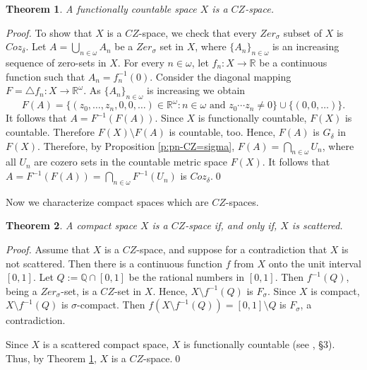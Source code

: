 \documentclass[preprint,11pt]{elsarticle}
\newtheorem{theorem}{Theorem}[section]
\numberwithin{equation}{section}
\numberwithin{theorem}{section}
\newcommand{\w}{\omega}
\newcommand{\IR}{\mathbb{R}}
\begin{document}
\begin{theorem}\label{t:cz-fc}
A functionally countable space $X$ is a $CZ$-space.
\end{theorem}

\begin{proof}
To show that $X$ is a $CZ$-space, we check that every $Zer_{\sigma}$ subset of $X$ is $Coz_{\delta}$. Let $A=\bigcup_{n\in\w} A_n$ be a  $Zer_{\sigma}$ set in $X$, where $\{A_n\}_{n\in\w}$ is an increasing sequence of zero-sets in $X$. For every $n\in\w$, let $f_n: X\to \IR$ be a continuous function such that $A_n=f^{-1}_n(0)$. Consider the diagonal mapping $F=\triangle f_n: X\to \IR^{\w}$. As $\{A_n\}_{n\in\w}$ is increasing we obtain
\[
F(A)=\big\{(z_0,\dots,z_n,0,0,\dots)\in\IR^\w: n\in\w \mbox{ and } z_0\cdots z_n\not=0\big\} \cup\{(0,0,\dots)\}.
\]
It follows that $A=F^{-1}(F(A))$. Since $X$ is functionally countable, $F(X)$ is countable. Therefore $F(X)\setminus F(A)$ is countable, too. Hence, $F(A)$ is $G_{\delta}$ in $F(X)$. Therefore, by Proposition \ref{p:pn-CZ=sigma}, $F(A)=\bigcap_{n\in\w} U_n$, where all $U_n$ are cozero sets in the countable metric space $F(X)$. It follows that $A=F^{-1}(F(A))=\bigcap_{n\in\w} F^{-1}(U_n)$ is $Coz_{\delta}$.\qed
\end{proof}


Now we characterize compact spaces which are $CZ$-spaces.
\begin{theorem}\label{t:cz-compact}
A compact space $X$ is a $CZ$-space if, and only if, $X$ is scattered.
\end{theorem}

\begin{proof}
Assume that $X$ is a $CZ$-space, and suppose for a contradiction that $X$ is not scattered. Then there is a continuous function $f$ from $X$ onto the unit interval $[0,1]$. Let $Q:=\mathbb{Q}\cap[0,1]$ be the rational numbers in $[0,1]$. Then $f^{-1}(Q)$, being a $Zer_\sigma$-set, is a $CZ$-set in $X$. Hence, $X\setminus f^{-1}(Q)$ is $F_{\sigma}$. Since $X$ is compact, $X\setminus f^{-1}(Q)$ is $\sigma$-compact. Then $f(X\setminus f^{-1}(Q))=[0,1]\setminus Q$ is $F_{\sigma}$,  a contradiction.
\smallskip

Since $X$ is a scattered compact space, $X$ is functionally countable (see \cite{Arh}, \S 3). Thus, by Theorem \ref{t:cz-fc}, $X$ is a $CZ$-space.\qed
\end{proof}





\end{document}
